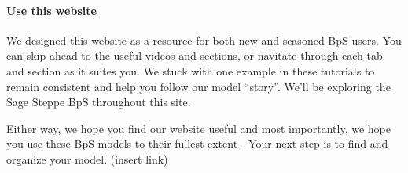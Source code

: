 \documentclass[
]{article}
\begin{document}
\hypertarget{use-this-website}{%
\paragraph{Use this website}\label{use-this-website}}

We designed this website as a resource for both new and seasoned BpS
users. You can skip ahead to the useful videos and sections, or navitate
through each tab and section as it suites you. We stuck with one example
in these tutorials to remain consistent and help you follow our model
``story''. We'll be exploring the Sage Steppe BpS throughout this site.

Either way, we hope you find our website useful and most importantly, we
hope you use these BpS models to their fullest extent - Your next step
is to find and organize your model. (insert link)
\end{document}
